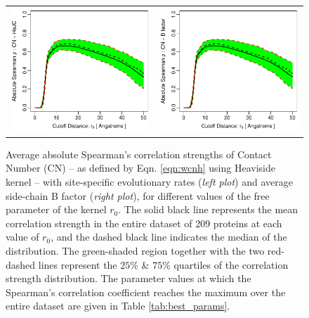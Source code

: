 \documentclass[11pt]{article}
\begin{document}
    \begin{figure}
        \begin{center}
        \begin{tabular}{cc}
            \includegraphics[width=3.3in]{../../wcn_best_definition/analysis/figures/get_quantiles/screen_plots/spcor_cnSC_r4sJC.pdf} & \includegraphics[width=3.3in]{../../wcn_best_definition/analysis/figures/get_quantiles/screen_plots/spcor_cnSC_bfSC.pdf}
        \end{tabular}
        \end{center}
        \caption{Average absolute Spearman's correlation strengths of Contact Number (CN) -- as defined by Eqn. \ref{eqn:wcnh} using Heaviside kernel -- with site-specific evolutionary rates ({\it left plot}) and average side-chain B factor ({\it right plot}), for different values of the free parameter of the kernel $r_0$. The solid black line represents the mean correlation strength in the entire dataset of 209 proteins at each value of $r_0$, and the dashed black line indicates the median of the distribution. The green-shaded region together with the two red-dashed lines represent the $25\%$ \& $75\%$ quartiles of the correlation strength distribution.  The parameter values at which the Spearman's correlation coefficient reaches the maximum over the entire dataset are given in Table \ref{tab:best_params}.}
        \label{fig:cn}
    \end{figure}
\end{document}
